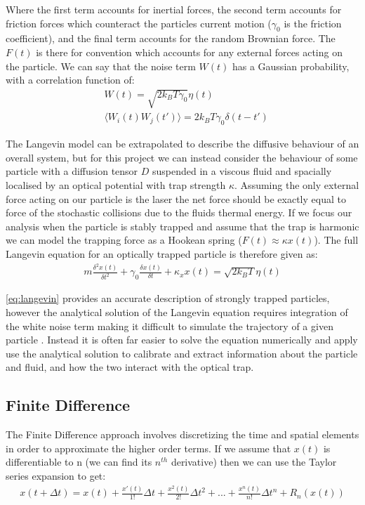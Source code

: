 Where the first term accounts for inertial forces, the second term accounts 
for friction forces which counteract the particles current motion ($\gamma_0$ 
is the friction coefficient), and the final term accounts for the random 
Brownian force. The $F(t)$ is there for convention which accounts for any 
external forces acting on the particle. We can say that the noise term 
$W(t)$ has a Gaussian probability, with a correlation function of:
\begin{align}
	&W(t) = \sqrt{2k_BT\gamma_0}\eta(t) \\
	&\langle W_i(t)W_j(t')\rangle = 2k_BT\gamma_0\delta(t-t')
\end{align}

The Langevin model can be extrapolated to describe the diffusive behaviour 
of an overall system, but for this project we can instead consider the 
behaviour of some particle with a diffusion tensor $D$ suspended in a 
viscous fluid and spacially localised by an optical potential with trap 
strength $\kappa$. Assuming the only external force acting on our particle 
is the laser the net force should be exactly equal to force of the stochastic
collisions due to the fluids thermal energy. If we focus our analysis when 
the particle is stably trapped and assume that the trap is harmonic we can 
model the trapping force as a Hookean spring ($F(t) \approx \kappa x(t)$). 
The full Langevin equation for an optically trapped particle is therefore given as:
\begin{align}
	\label{eq:langevin}
	m\frac{\delta^2x(t)}{\delta t^2} + \gamma_0 \frac{\delta x(t)}{\delta t} + \kappa_x x(t) = \sqrt{2k_BT}\eta(t)
\end{align}

\eqref{eq:langevin} provides an accurate description of strongly trapped 
particles, however the analytical solution of the Langevin equation requires 
integration of the white noise term making it difficult to simulate the 
trajectory of a given particle \cite{Volpe2013}. Instead it is often far 
easier to solve the equation numerically and apply use the analytical 
solution to calibrate and extract information about the particle and fluid, 
and how the two interact with the optical trap.

\subsection{Finite Difference}
The Finite Difference approach involves discretizing the time and spatial 
elements in order to approximate the higher order terms. If we assume that 
$x(t)$ is differentiable to n (we can find its $n^{th}$ derivative) then 
we can use the Taylor series expansion to get:
\begin{align}
	x(t+\Delta t) = x(t)+\frac{x'(t)}{1!}\Delta t + \frac{x^2(t)}{2!}\Delta t^2+...+\frac{x^n(t)}{n!}\Delta t^n+R_n(x(t))	
\end{align}

